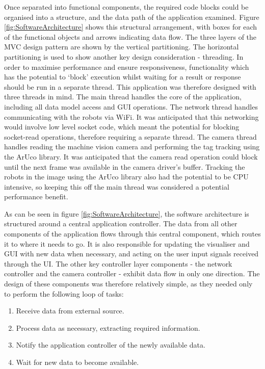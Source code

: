 Once separated into functional components, the required code blocks could be organised into a structure, and the data path of the application examined. Figure \ref{fig:SoftwareArchitecture} shows this structural arrangement, with boxes for each of the functional objects and arrows indicating data flow. The three layers of the MVC design pattern are shown by the vertical partitioning. The horizontal partitioning is used to show another key design consideration - threading. In order to maximise performance and ensure responsiveness, functionality which has the potential to `block' execution whilst waiting for a result or response should be run in a separate thread. This application was therefore designed with three threads in mind. The main thread handles the core of the application, including all data model access and GUI operations. The network thread handles communicating with the robots via WiFi. It was anticipated that this networking would involve low level socket code, which meant the potential for blocking socket-read operations, therefore requiring a separate thread. The camera thread handles reading the machine vision camera and performing the tag tracking using the ArUco library. It was anticipated that the camera read operation could block until the next frame was available in the camera driver's buffer. Tracking the robots in the image using the ArUco library also had the potential to be CPU intensive, so keeping this off the main thread was considered a potential performance benefit.

As can be seen in figure \ref{fig:SoftwareArchitecture}, the software architecture is structured around a central application controller. The data from all other components of the application flows through this central component, which routes it to where it needs to go. It is also responsible for updating the visualiser and GUI with new data when necessary, and acting on the user input signals received through the UI. The other key controller layer components - the network controller and the camera controller - exhibit data flow in only one direction. The design of these components was therefore relatively simple, as they needed only to perform the following loop of tasks:

\begin{enumerate}
 \item Receive data from external source.
 \item Process data as necessary, extracting required information.
 \item Notify the application controller of the newly available data.
 \item Wait for new data to become available.
\end{enumerate}

